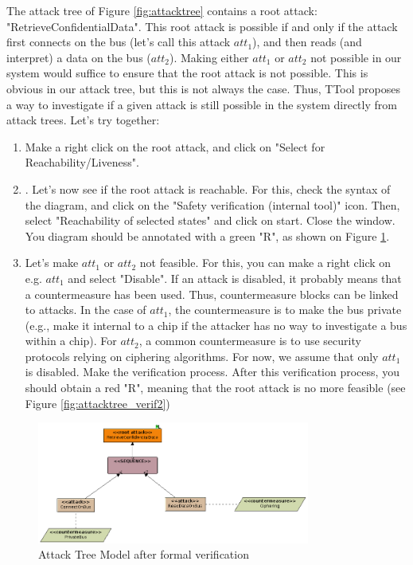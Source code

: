 \documentclass[12pt]{article}
\begin{document}
The attack tree of Figure \ref{fig:attacktree} contains a root attack: "RetrieveConfidentialData". This root attack is possible if and only if the attack first connects on the bus (let's call this attack $att_1$), and then reads (and interpret) a data on the bus ($att_2$). Making either $att_1$ or $att_2$ not possible in our system would suffice to ensure that the root attack is not possible.  This is obvious in our attack tree, but this is not always the case. Thus, TTool proposes a way to investigate if a given attack is still possible in the system directly from attack trees. Let's try together:
\begin{enumerate}
\item Make a right click on the root attack, and click on  "Select for Reachability/Liveness".
\item. Let's now see if the root attack is reachable. For this, check the syntax of the diagram, and click on the "Safety verification (internal tool)" icon. Then, select "Reachability of selected states" and click on start. Close the window. You diagram should be annotated with a green "R", as shown on Figure \ref{fig:attacktree_verif1}.
\item Let's make $att_1$ or $att_2$ not feasible. For this, you can make a right click on e.g. $att_1$ and select "Disable". If an attack is disabled, it probably means that a countermeasure has been used. Thus, countermeasure blocks can be linked to attacks. In the case of $ att_1$, the countermeasure is to make the bus private (e.g., make it internal to a chip if the attacker has no way to investigate a bus within a chip). For $att_2$, a common countermeasure is to use security protocols relying on ciphering algorithms. For now, we assume that only $att_1$ is disabled. Make the verification process. After this verification process, you should obtain a red "R", meaning that the root attack is no more feasible (see Figure \ref{fig:attacktree_verif2})
 \end{enumerate}


\begin{figure}[htbp]
\centering
\includegraphics[width=0.8\textwidth]{fig/attacktree_verif1.png}
\caption{Attack Tree Model after formal verification} \label{fig:attacktree_verif1}
\end{figure}
\end{document}
